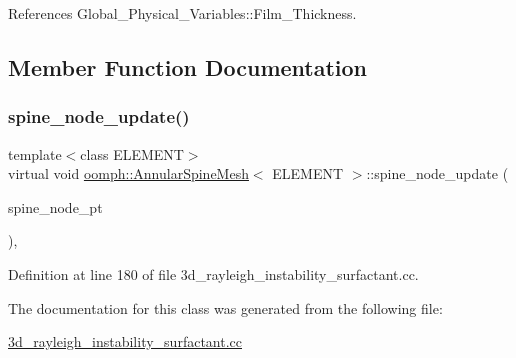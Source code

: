 References Global\+\_\+\+Physical\+\_\+\+Variables\+::\+Film\+\_\+\+Thickness.



\subsection{Member Function Documentation}
\mbox{\label{classoomph_1_1AnnularSpineMesh_abbdfd1078b2d798f5f5abadb817f58cb}} 
\subsubsection{\texorpdfstring{spine\+\_\+node\+\_\+update()}{spine\_node\_update()}}
{\footnotesize\ttfamily template$<$class E\+L\+E\+M\+E\+NT$>$ \\
virtual void \hyperlink{classoomph_1_1AnnularSpineMesh}{oomph\+::\+Annular\+Spine\+Mesh}$<$ E\+L\+E\+M\+E\+NT $>$\+::spine\+\_\+node\+\_\+update (\begin{DoxyParamCaption}\item[{Spine\+Node $\ast$}]{spine\+\_\+node\+\_\+pt }\end{DoxyParamCaption})\hspace{0.3cm}{\ttfamily [inline]}, {\ttfamily [virtual]}}



Definition at line 180 of file 3d\+\_\+rayleigh\+\_\+instability\+\_\+surfactant.\+cc.



The documentation for this class was generated from the following file\+:\begin{DoxyCompactItemize}
\item 
\hyperlink{3d__rayleigh__instability__surfactant_8cc}{3d\+\_\+rayleigh\+\_\+instability\+\_\+surfactant.\+cc}\end{DoxyCompactItemize}
